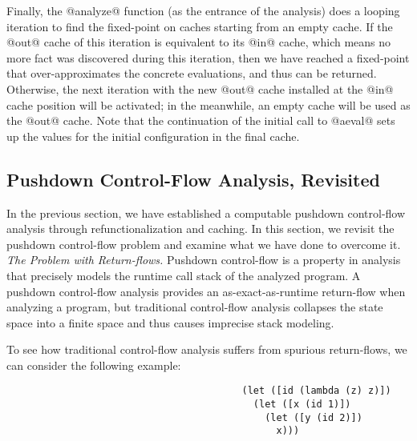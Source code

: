 \documentclass[acmsmall, review]{acmart}\settopmatter{}
\begin{document}
Finally, the @analyze@ function (as the entrance of the analysis) does a looping iteration
to find the fixed-point on caches starting from an empty cache.
If the @out@ cache of this iteration is equivalent to its @in@ cache, which means no more 
fact was discovered during this iteration, then we have reached a fixed-point that 
over-approximates the concrete evaluations, and thus can be returned.
Otherwise, the next iteration with the new @out@ cache installed at the @in@ cache position 
will be activated; in the meanwhile, an empty cache will be used as the @out@ cache.
Note that the continuation of the initial call to @aeval@ sets up the values for the
initial configuration in the final cache.

\subsection{Pushdown Control-Flow Analysis, Revisited} \label{pdcfarevisit}

In the previous section, we have established a computable pushdown control-flow
analysis through refunctionalization and caching. In this section,
we revisit the pushdown control-flow problem and examine what we have done to
overcome it. \\

\textit{The Problem with Return-flows.}
Pushdown control-flow is a property in analysis that precisely models
the runtime call stack of the analyzed program.
A pushdown control-flow analysis provides an as-exact-as-runtime return-flow
when analyzing a program, but traditional control-flow analysis collapses
the state space into a finite space and thus causes imprecise stack modeling.

To see how traditional control-flow analysis suffers from spurious return-flows,
we can consider the following example:

\begin{lstlisting}
                                         (let ([id (lambda (z) z)])
                                           (let ([x (id 1)])
                                             (let ([y (id 2)])
                                               x)))
\end{lstlisting}
\end{document}
